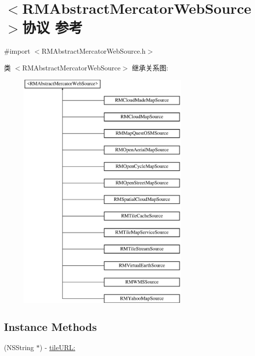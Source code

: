 \hypertarget{protocol_r_m_abstract_mercator_web_source-p}{\section{$<$R\-M\-Abstract\-Mercator\-Web\-Source$>$协议 参考}
\label{protocol_r_m_abstract_mercator_web_source-p}
}


{\ttfamily \#import $<$R\-M\-Abstract\-Mercator\-Web\-Source.\-h$>$}

类 $<$R\-M\-Abstract\-Mercator\-Web\-Source$>$ 继承关系图\-:\begin{figure}[H]
\begin{center}
\leavevmode
\includegraphics[height=12.000000cm]{protocol_r_m_abstract_mercator_web_source-p}
\end{center}
\end{figure}
\subsection*{Instance Methods}
\begin{DoxyCompactItemize}
\item 
(N\-S\-String $\ast$) -\/ \hyperlink{protocol_r_m_abstract_mercator_web_source-p_ae5c62f0fed7dcdfd78aa9582bdec9b4b}{tile\-U\-R\-L\-:}
\end{DoxyCompactItemize}



